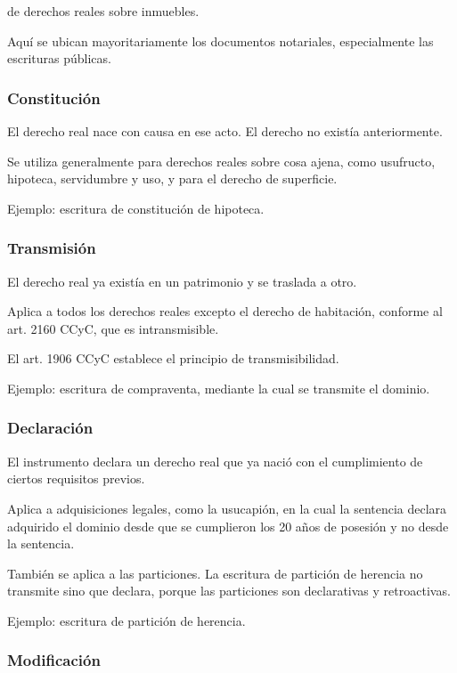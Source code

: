 \documentclass[12pt]{book}
\begin{document}
de derechos reales sobre inmuebles.

Aqu\'i se ubican mayoritariamente los documentos notariales, especialmente las escrituras p\'ublicas.

\subsubsection{Constituci\'on}

El derecho real nace con causa en ese acto. El derecho no exist\'ia anteriormente.

Se utiliza generalmente para derechos reales sobre cosa ajena, como usufructo, hipoteca, servidumbre y uso, y para el derecho de superficie.

Ejemplo: escritura de constituci\'on de hipoteca.

\subsubsection{Transmisi\'on}

El derecho real ya exist\'ia en un patrimonio y se traslada a otro.

Aplica a todos los derechos reales excepto el derecho de habitaci\'on, conforme al art. 2160 CCyC, que es intransmisible.

El art. 1906 CCyC establece el principio de transmisibilidad.

Ejemplo: escritura de compraventa, mediante la cual se transmite el dominio.

\subsubsection{Declaraci\'on}

El instrumento declara un derecho real que ya naci\'o con el cumplimiento de ciertos requisitos previos.

Aplica a adquisiciones legales, como la usucapi\'on, en la cual la sentencia declara adquirido el dominio desde que se cumplieron los 20 a\~nos de posesi\'on y no desde la sentencia.

Tambi\'en se aplica a las particiones. La escritura de partici\'on de herencia no transmite sino que declara, porque las particiones son declarativas y retroactivas.

Ejemplo: escritura de partici\'on de herencia.

\subsubsection{Modificaci\'on}
\end{document}
